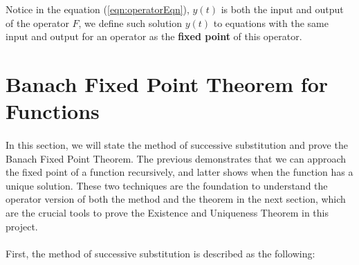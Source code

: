\documentclass{article}
\theoremstyle{definition}
\theoremstyle{remark}
\theoremstyle{example}
\begin{document}
Notice in the equation (\ref{eqn:operatorEqn}), $y(t)$ is both the input and output of the operator $F$, we define such solution $y(t)$ to equations with the same input and output for an operator as the \textbf{fixed point} of this operator.

\section{Banach Fixed Point Theorem for Functions}

\paragraph{  }

In this section, we will state the method of successive substitution and prove the Banach Fixed Point Theorem. The previous demonstrates that we can approach the fixed point of a function recursively, and latter shows when the function has a unique solution. These two techniques are the foundation to understand the operator version of both the method and the theorem in the next section, which are the crucial tools to prove the Existence and Uniqueness Theorem in this project. 

\paragraph{  }

First, the method of successive substitution is described as the following:
\end{document}
